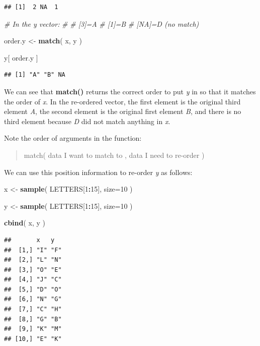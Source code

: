 \documentclass[]{book}
\newenvironment{Shaded}{\begin{snugshade}}{\end{snugshade}}
\newcommand{\CommentTok}[1]{\textcolor[rgb]{0.56,0.35,0.01}{\textit{#1}}}
\newcommand{\DataTypeTok}[1]{\textcolor[rgb]{0.13,0.29,0.53}{#1}}
\newcommand{\DecValTok}[1]{\textcolor[rgb]{0.00,0.00,0.81}{#1}}
\newcommand{\KeywordTok}[1]{\textcolor[rgb]{0.13,0.29,0.53}{\textbf{#1}}}
\newcommand{\NormalTok}[1]{#1}
\newcommand{\OperatorTok}[1]{\textcolor[rgb]{0.81,0.36,0.00}{\textbf{#1}}}
\newcommand{\StringTok}[1]{\textcolor[rgb]{0.31,0.60,0.02}{#1}}
\theoremstyle{definition}
\theoremstyle{definition}
\theoremstyle{definition}
\theoremstyle{remark}
\begin{document}
\begin{verbatim}
## [1]  2 NA  1
\end{verbatim}

\begin{Shaded}
\begin{Highlighting}[]
\CommentTok{# In the y vector:}
\CommentTok{#}
\CommentTok{#  [3]=A}
\CommentTok{#  [1]=B}
\CommentTok{# [NA]=D (no match)}

\NormalTok{order.y <-}\StringTok{ }\KeywordTok{match}\NormalTok{( x, y )}

\NormalTok{y[ order.y ]}
\end{Highlighting}
\end{Shaded}

\begin{verbatim}
## [1] "A" "B" NA
\end{verbatim}

We can see that \textbf{match()} returns the correct order to put
\emph{y} in so that it matches the order of \emph{x}. In the re-ordered
vector, the first element is the original third element \emph{A}, the
second element is the original first element \emph{B}, and there is no
third element because \emph{D} did not match anything in \emph{x}.

Note the order of arguments in the function:

\begin{quote}
match( data I want to match to , data I need to re-order )
\end{quote}

We can use this position information to re-order \emph{y} as follows:

\begin{Shaded}
\begin{Highlighting}[]
\NormalTok{x <-}\StringTok{ }\KeywordTok{sample}\NormalTok{( LETTERS[}\DecValTok{1}\OperatorTok{:}\DecValTok{15}\NormalTok{], }\DataTypeTok{size=}\DecValTok{10}\NormalTok{ )}

\NormalTok{y <-}\StringTok{ }\KeywordTok{sample}\NormalTok{( LETTERS[}\DecValTok{1}\OperatorTok{:}\DecValTok{15}\NormalTok{], }\DataTypeTok{size=}\DecValTok{10}\NormalTok{ )}

\KeywordTok{cbind}\NormalTok{( x, y )}
\end{Highlighting}
\end{Shaded}

\begin{verbatim}
##       x   y  
##  [1,] "I" "F"
##  [2,] "L" "N"
##  [3,] "O" "E"
##  [4,] "J" "C"
##  [5,] "D" "O"
##  [6,] "N" "G"
##  [7,] "C" "H"
##  [8,] "G" "B"
##  [9,] "K" "M"
## [10,] "E" "K"
\end{verbatim}
\end{document}
